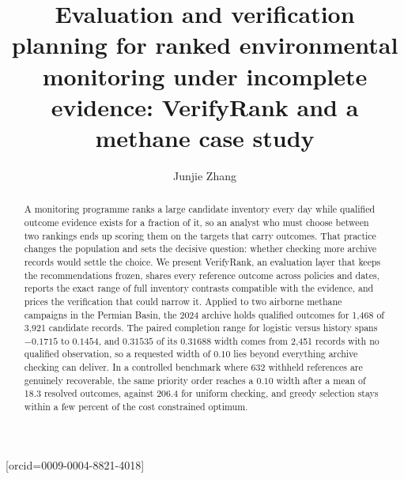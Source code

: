 \documentclass[a4paper,fleqn,longmktitle]{cas-sc}
\begin{document}
\let\WriteBookmarks\relax
\def\floatpagepagefraction{1}
\def\textpagefraction{.001}

\title[mode=title]{Evaluation and verification planning for ranked environmental monitoring under incomplete evidence: VerifyRank and a methane case study}

\author[1,2]{Junjie Zhang}[orcid=0009-0004-8821-4018]
\cormark[1]



\begin{abstract}
A monitoring programme ranks a large candidate inventory every day while qualified outcome evidence exists for a fraction of it, so an analyst who must choose between two rankings ends up scoring them on the targets that carry outcomes. That practice changes the population and sets the decisive question: whether checking more archive records would settle the choice. We present VerifyRank, an evaluation layer that keeps the recommendations frozen, shares every reference outcome across policies and dates, reports the exact range of full inventory contrasts compatible with the evidence, and prices the verification that could narrow it. Applied to two airborne methane campaigns in the Permian Basin, the 2024 archive holds qualified outcomes for 1,468 of 3,921 candidate records. The paired completion range for logistic versus history spans $-0.1715$ to $0.1454$, and $0.31535$ of its $0.31688$ width comes from 2,451 records with no qualified observation, so a requested width of $0.10$ lies beyond everything archive checking can deliver. In a controlled benchmark where 632 withheld references are genuinely recoverable, the same priority order reaches a $0.10$ width after a mean of 18.3 resolved outcomes, against 206.4 for uniform checking, and greedy selection stays within a few percent of the cost constrained optimum.
\end{abstract}
\end{document}
